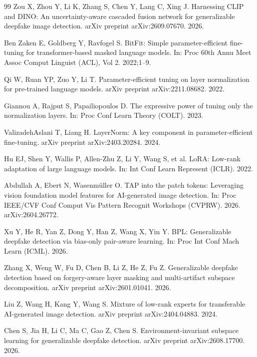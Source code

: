 \documentclass[fonts]{icst}
\begin{document}
\begin{thebibliography}{99}
Zou X, Zhou Y, Li K, Zhang S, Chen Y, Lang C, Xing J.
Harnessing CLIP and DINO: An uncertainty-aware cascaded fusion network for generalizable deepfake image detection.
arXiv preprint arXiv:2609.07670. 2026.

Ben Zaken E, Goldberg Y, Ravfogel S.
BitFit: Simple parameter-efficient fine-tuning for transformer-based masked language models.
In: Proc 60th Annu Meet Assoc Comput Linguist (ACL), Vol 2. 2022;1--9.

Qi W, Ruan YP, Zuo Y, Li T.
Parameter-efficient tuning on layer normalization for pre-trained language models.
arXiv preprint arXiv:2211.08682. 2022.

Giannou A, Rajput S, Papailiopoulos D.
The expressive power of tuning only the normalization layers.
In: Proc Conf Learn Theory (COLT). 2023.

ValizadehAslani T, Liang H.
LayerNorm: A key component in parameter-efficient fine-tuning.
arXiv preprint arXiv:2403.20284. 2024.

Hu EJ, Shen Y, Wallis P, Allen-Zhu Z, Li Y, Wang S, et al.
LoRA: Low-rank adaptation of large language models.
In: Int Conf Learn Represent (ICLR). 2022.

Abdullah A, Ebert N, Wasenm{\"u}ller O.
TAP into the patch tokens: Leveraging vision foundation model features for AI-generated image detection.
In: Proc IEEE/CVF Conf Comput Vis Pattern Recognit Workshops (CVPRW). 2026. arXiv:2604.26772.

Xu Y, He R, Yan Z, Dong Y, Han Z, Wang X, Yin Y.
BPL: Generalizable deepfake detection via bias-only pair-aware learning.
In: Proc Int Conf Mach Learn (ICML). 2026.

Zhang X, Weng W, Fu D, Chen B, Li Z, He Z, Fu Z.
Generalizable deepfake detection based on forgery-aware layer masking and multi-artifact subspace decomposition.
arXiv preprint arXiv:2601.01041. 2026.

Liu Z, Wang H, Kang Y, Wang S.
Mixture of low-rank experts for transferable AI-generated image detection.
arXiv preprint arXiv:2404.04883. 2024.

Chen S, Jia H, Li C, Ma C, Gao Z, Chen S.
Environment-invariant subspace learning for generalizable deepfake detection.
arXiv preprint arXiv:2608.17700. 2026.


\end{thebibliography}
\end{document}
